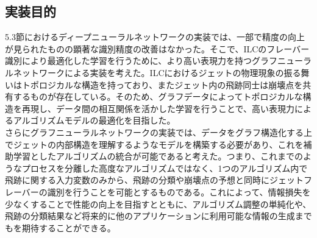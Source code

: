 \subsection{実装目的}
5.3節におけるディープニューラルネットワークの実装では、一部で精度の向上が見られたものの顕著な識別精度の改善はなかった。そこで、ILCのフレーバー識別により最適化した学習を行うために、より高い表現力を持つグラフニューラルネットワークによる実装を考えた。ILCにおけるジェットの物理現象の振る舞いはトポロジカルな構造を持っており、またジェット内の飛跡同士は崩壊点を共有するものが存在している。そのため、グラフデータによってトポロジカルな構造を再現し、データ間の相互関係を活かした学習を行うことで、高い表現力によるアルゴリズムモデルの最適化を目指した。\\
さらにグラフニューラルネットワークの実装では、データをグラフ構造化する上でジェットの内部構造を理解するようなモデルを構築する必要があり、これを補助学習としたアルゴリズムの統合が可能であると考えた。つまり、これまでのようなプロセスを分離した高度なアルゴリズムではなく、1つのアルゴリズム内で飛跡に関する入力変数のみから、飛跡の分類や崩壊点の予想と同時にジェットフレーバーの識別を行うことを可能とするものである。これによって、情報損失を少なくすることで性能の向上を目指すとともに、アルゴリズム調整の単純化や、飛跡の分類結果など将来的に他のアプリケーションに利用可能な情報の生成までもを期待することができる。
